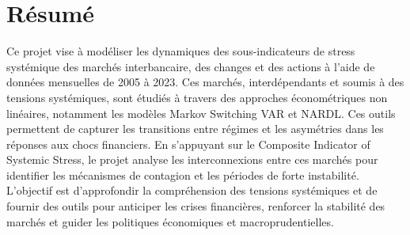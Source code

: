 {\centering
\vspace*{\fill}
\section*{Résumé}}
\begin{sloppypar}
  Ce projet vise à modéliser les dynamiques des sous-indicateurs de stress systémique des marchés interbancaire, des changes et des actions à l’aide de données mensuelles de 2005 à 2023. Ces marchés, interdépendants et soumis à des tensions systémiques, sont étudiés à travers des approches économétriques non linéaires, notamment les modèles Markov Switching VAR et NARDL. Ces outils permettent de capturer les transitions entre régimes et les asymétries dans les réponses aux chocs financiers. En s’appuyant sur le Composite Indicator of Systemic Stress, le projet analyse les interconnexions entre ces marchés pour identifier les mécanismes de contagion et les périodes de forte instabilité. L’objectif est d’approfondir la compréhension des tensions systémiques et de fournir des outils pour anticiper les crises financières, renforcer la stabilité des marchés et guider les politiques économiques et macroprudentielles. 
\end{sloppypar}
\vspace*{\fill}